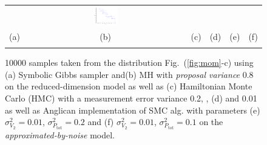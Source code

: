 \documentclass[]{article}
\newcommand{\nn}{0.16}
\begin{document}
\begin{figure}[t!]
\begin{center}
\begin{tabular}{cccccc}
& \hspace{-3mm} \includegraphics[width=\nn\textwidth]{Figs2/col_c_ang_10000_01_001}
\vspace{-1.5mm}
\\
   \hspace{-5mm} \footnotesize(a) 
& \hspace{-4mm} \footnotesize(b) 
& \hspace{-3mm} \footnotesize(c) 
&\hspace{-1mm} \footnotesize(d) 
&\hspace{-1mm} \footnotesize(e) 
&\hspace{-1mm} \footnotesize(f)\\
\multicolumn{6}{c}{}
\end{tabular}
\end{center}
\vspace{-8mm}
\caption{\footnotesize
10000 samples taken from the distribution Fig.~(\ref{fig:mom}-c)
using (a) Symbolic Gibbs sampler and(b) MH with \emph{proposal variance} 0.8 
on the reduced-dimension model as well as  
(c) Hamiltonian Monte Carlo (HMC) with a measurement error variance 0.2, 
, (d) and 0.01 as well as Anglican implementation of SMC alg. with %
parameters (e)
$\sigma^2_{V_2} = 0.01$, $\sigma^2_{P_\text{tot}} = 0.2$ and 
(f) $\sigma^2_{V_2} = 0.01$, $\sigma^2_{P_\text{tot}} = 0.1$
on the \emph{approximated-by-noise} model.
}
\label{fig:mom2}
\vspace{-4mm}
\end{figure}
\end{document}
